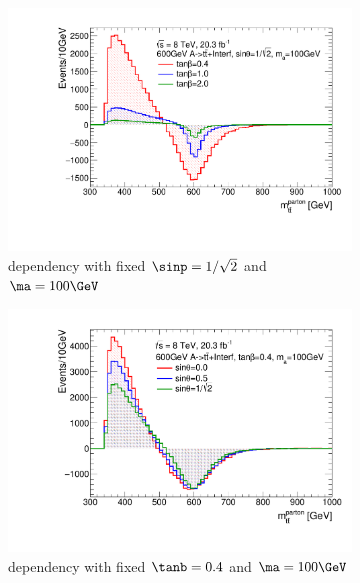\begin{figure}
\centering
\begin{subfigure}[b]{0.49\textwidth}
\includegraphics[width=\textwidth]{texinputs/04_grid/figures/ttres/ttres_2HDMa_A_tanb.pdf}
\caption{\tanb dependency with fixed $\sinp=1/\sqrt{2}$ and $\ma=100\GeV$}
\end{subfigure}
\begin{subfigure}[b]{0.49\textwidth}
\includegraphics[width=\textwidth]{texinputs/04_grid/figures/ttres/ttres_2HDMa_A_sinp.pdf}
\caption{\sinp dependency with fixed $\tanb=0.4$ and $\ma=100\GeV$}
\end{subfigure}
\begin{subfigure}[b]{0.49\textwidth}

\end{subfigure}
\end{figure}
